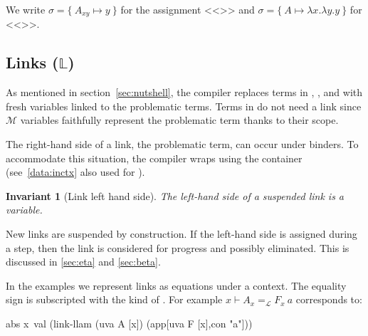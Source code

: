 \documentclass[sigconf,natbib=false,review]{acmart}
\newtheorem{invariant}{Invariant}
\newcommand{\llambda}{\ensuremath{\mathcal{L}}\xspace}
\newcommand{\Ho}{\texorpdfstring{\ensuremath{\mathcal{M}}\xspace}{M}}
\newcommand{\linkbetaM}[3]{\ensuremath{#1 \vdash #2 =_{\llambda} #3}}
\newcommand{\linkStore}{\texorpdfstring{\ensuremath{\mathbb{L}}\xspace}{L}}
\begin{document}


We write $\sigma = \{~ A_{xy} \mapsto y ~\}$ for the assignment
<<>> and $\sigma = \{~ A \mapsto \lambda x.\lambda y.y ~\}$
for <<>>.

\subsection{Links (\linkStore)}

\noindent
As mentioned in section~\ref{sec:nutshell}, the compiler
replaces terms in \maybeeta, \maybebeta, and \notllambda with fresh
variables linked to the problematic terms. Terms in \maybebeta do not
need a link since \Ho{} variables faithfully represent
the problematic term thanks to their scope.



\noindent
The right-hand side of a link, the problematic term, can occur under binders.
To accommodate this situation, the compiler wraps  using
the  container (see~\ref{data:inctx} also used for ).

\begin{invariant}[Link left hand side]\label{inv:linklhs}
  The left-hand side of a suspended link
  is a variable.
\end{invariant}

\noindent
New links are suspended by construction.
If the left-hand side is assigned during a step, then 
the link is considered for progress and possibly eliminated.
This is discussed in \cref{sec:eta} and \cref{sec:beta}.

In the examples we represent links as equations
under a context.
The equality sign is subscripted with the
kind of . For example $\linkbetaM{x}{A_x}{F_x~a}$ corresponds to:
\begin{elpicode}
abs x\ val (link-llam (uva A [x]) (app[uva F [x],con "a"]))
\end{elpicode}

\end{document}
